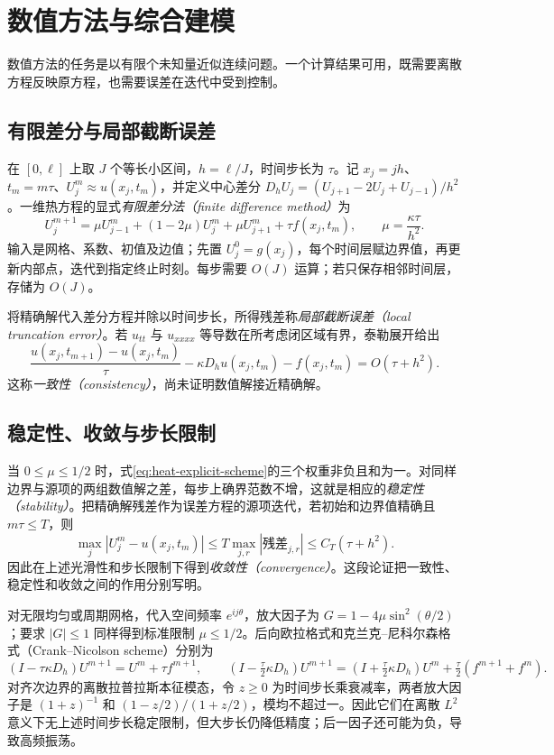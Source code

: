 \setcounter{chapter}{17} %
\chapter{数值方法与综合建模}
\label{chap:numerics}

数值方法的任务是以有限个未知量近似连续问题。一个计算结果可用，既需要离散方程反映原方程，也需要误差在迭代中受到控制。

\section{有限差分与局部截断误差}
在 $[0,\ell]$ 上取 $J$ 个等长小区间，$h=\ell/J$，时间步长为 $\tau$。记 $x_j=jh$、$t_m=m\tau$、$U_j^m\approx u(x_j,t_m)$，并定义中心差分 $D_hU_j=(U_{j+1}-2U_j+U_{j-1})/h^2$。一维热方程的显式\emph{有限差分法（finite difference method）}为
\begin{equation}
 U_j^{m+1}=\mu U_{j-1}^m+(1-2\mu)U_j^m+\mu U_{j+1}^m+\tau f(x_j,t_m),
 \qquad \mu=\frac{\kappa\tau}{h^2}.
 \label{eq:heat-explicit-scheme}
\end{equation}
输入是网格、系数、初值及边值；先置 $U_j^0=g(x_j)$，每个时间层赋边界值，再更新内部点，迭代到指定终止时刻。每步需要 $O(J)$ 运算；若只保存相邻时间层，存储为 $O(J)$。

将精确解代入差分方程并除以时间步长，所得残差称\emph{局部截断误差（local truncation error）}。若 $u_{tt}$ 与 $u_{xxxx}$ 等导数在所考虑闭区域有界，泰勒展开给出
\[
 \frac{u(x_j,t_{m+1})-u(x_j,t_m)}\tau-\kappa D_hu(x_j,t_m)-f(x_j,t_m)
 =O(\tau+h^2).
\]
这称\emph{一致性（consistency）}，尚未证明数值解接近精确解。

\section{稳定性、收敛与步长限制}
当 $0\le\mu\le1/2$ 时，式\eqref{eq:heat-explicit-scheme}的三个权重非负且和为一。对同样边界与源项的两组数值解之差，每步上确界范数不增，这就是相应的\emph{稳定性（stability）}。把精确解残差作为误差方程的源项迭代，若初始和边界值精确且 $m\tau\le T$，则
\[
 \max_j|U_j^m-u(x_j,t_m)|\le T\max_{j,r}|\text{残差}_{j,r}|
 \le C_T(\tau+h^2).
\]
因此在上述光滑性和步长限制下得到\emph{收敛性（convergence）}。这段论证把一致性、稳定性和收敛之间的作用分别写明。

对无限均匀或周期网格，代入空间频率 $e^{ij\theta}$，放大因子为 $G=1-4\mu\sin^2(\theta/2)$；要求 $|G|\le1$ 同样得到标准限制 $\mu\le1/2$。后向欧拉格式和克兰克--尼科尔森格式（Crank--Nicolson scheme）分别为
\[
 (I-\tau\kappa D_h)U^{m+1}=U^m+\tau f^{m+1},\qquad
 (I-\tfrac\tau2\kappa D_h)U^{m+1}=(I+\tfrac\tau2\kappa D_h)U^m+\tfrac\tau2(f^{m+1}+f^m).
\]
对齐次边界的离散拉普拉斯本征模态，令 $z\ge0$ 为时间步长乘衰减率，两者放大因子是 $(1+z)^{-1}$ 和 $(1-z/2)/(1+z/2)$，模均不超过一。因此它们在离散 $L^2$ 意义下无上述时间步长稳定限制，但大步长仍降低精度；后一因子还可能为负，导致高频振荡。

